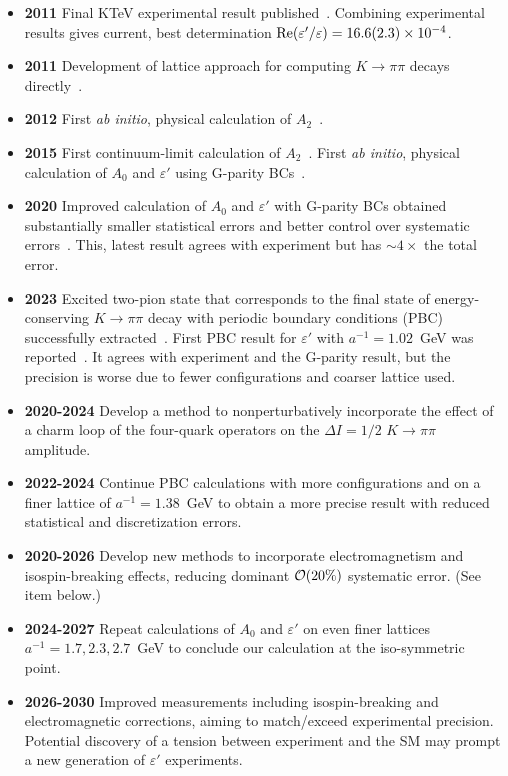 \documentclass[12pt,hyperpdf]{article}
\begin{document}
\begin{itemize}
\begin{itemize}
    \item{\bf 2011} Final KTeV experimental result published~\cite{KTeV:2010sng}. Combining experimental results gives current, best determination ${\rm Re}(\varepsilon'/\varepsilon)=16.6(2.3)\times 10^{-4}$.
    \item{\bf 2011} Development of lattice approach for computing $K\to\pi\pi$ decays directly~\cite{Blum:2011pu}.
    \item{\bf 2012} First {\it ab initio}, physical calculation of $A_2$~\cite{Blum:2011ng,Blum:2012uk}.
    \item{\bf 2015} First continuum-limit calculation of $A_2$~\cite{Blum:2015ywa}. First {\it ab initio}, physical calculation of $A_0$ and $\varepsilon'$ using G-parity BCs~\cite{RBC:2015gro}.
    \item{\bf 2020} Improved calculation of $A_0$ and $\varepsilon'$ with G-parity BCs obtained substantially smaller statistical errors and better control over systematic errors~\cite{RBC:2020kdj}. This, latest result agrees with experiment but has ${\sim}4\times$ the total error.
    \item{\bf 2023} Excited two-pion state that corresponds to the final state of energy-conserving $K\to\pi\pi$ decay with periodic boundary conditions (PBC) successfully extracted~\cite{RBC:2023xqv}.  First PBC result for $\varepsilon'$ with $a^{-1}=1.02$~GeV was reported~\cite{RBC:2023ynh}.  It agrees with experiment and the G-parity result, but the precision is worse due to fewer configurations and coarser lattice used.
    \item{\bf 2020-2024} Develop a method to nonperturbatively incorporate the effect of a charm loop of the four-quark operators on the $\Delta I=1/2$ $K\to\pi\pi$ amplitude.
    \item{\bf 2022-2024} Continue PBC calculations with more configurations and on a finer lattice of $a^{-1}=1.38$~GeV to obtain a more precise result with reduced statistical and discretization errors.
    \item{\bf 2020-2026} Develop new methods to incorporate electromagnetism and isospin-breaking effects, reducing dominant ${\cal O}(20\%)$ systematic error.  (See item below.)
    \item{\bf 2024-2027} Repeat calculations of $A_0$ and $\varepsilon'$ on even finer lattices $a^{-1}=1.7, 2.3, 2.7$~GeV to conclude our calculation at the iso-symmetric point. 
    \item{\bf 2026-2030} Improved measurements including isospin-breaking and electromagnetic corrections, aiming to match/exceed experimental precision. Potential discovery of a tension between experiment and the SM may prompt a new generation of $\varepsilon'$ experiments. 
\end{itemize}
\end{itemize}
\end{document}
